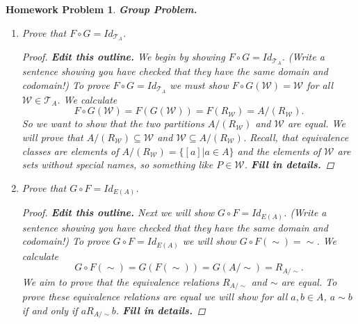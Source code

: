 \documentclass{article}
\newtheorem{hw}{Homework Problem}
\begin{document}
\begin{hw} {\bf Group Problem.}
\begin{enumerate}
			\item Prove that $F \circ G = Id_{\mathcal{T}_A}$.
			\begin{proof}    {\bf Edit this outline.} %
				We begin by showing $F \circ G = Id_{\mathcal{T}_A}$.  (Write a sentence showing you have checked that they have the same domain and codomain!) To prove $F \circ G = Id_{\mathcal{T}_A}$ we must show $F \circ G (\mathcal{W})=  \mathcal{W}$ for all  $\mathcal{W} \in \mathcal{T}_A$. We calculate
				$$ F \circ G (\mathcal{W})= F(G(\mathcal{W})) = F(R_{\mathcal{W}}) = A/(R_{\mathcal{W}}).$$
				So we want to show that the two partitions $A/(R_{\mathcal{W}})$ and $ \mathcal{W}$ are equal. We will prove that $A/(R_{\mathcal{W}}) \subseteq \mathcal{W}$  and $\mathcal{W} \subseteq A/(R_{\mathcal{W}})$. Recall, that equivalence classes are elements of
				$A/(R_{\mathcal{W}}) = \{ [a] | a \in A \}$  and the elements of $ \mathcal{W}$ are sets without special names, so something like $P \in \mathcal{W}$.
					{\bf Fill in details.}
			\end{proof}

			\item Prove that $G \circ F = Id_{E(A)}$.
			\begin{proof}   {\bf Edit this outline.} %
				Next we will show $G \circ F = Id_{E(A)}$.  (Write a sentence showing you have checked that they have the same domain and codomain!)   To prove $G \circ F = Id_{E(A)}$ we will show $G \circ F(\sim) =  \sim$. We calculate
				$$G \circ F(\sim)  = G(F(\sim)) = G(A/\sim) = R_{A/\sim}.$$
				We aim to prove that the equivalence relations $R_{A/\sim}$ and $\sim$ are equal. To prove these equivalence relations are equal we will show for all $a, b \in A$, $a \sim b$ if and only if $a R_{A/\sim} b$.
					{\bf Fill in details.}
			\end{proof}
		\end{enumerate}
	\end{hw}

	\underline{\hspace{5in}}

\end{document}
